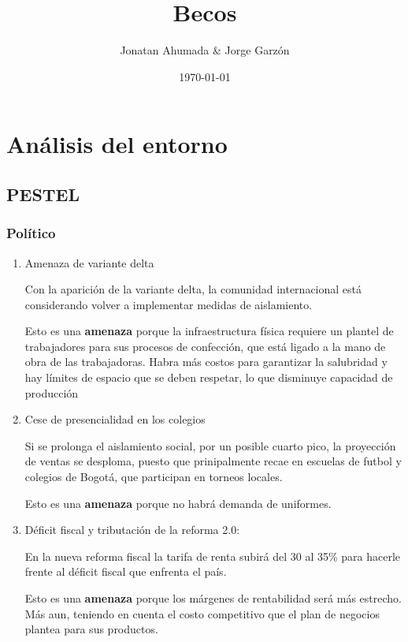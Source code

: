 \documentclass[11pt]{article}
\author{Jonatan Ahumada \& Jorge Garzón}
\date{\today}
\title{Becos}
\begin{document}
\maketitle
\tableofcontents



\section{Análisis del entorno}
\label{sec:orgb5b8dd2}
\subsection{PESTEL}
\label{sec:org09f5649}
\subsubsection{Político}
\label{sec:orga4b85a3}
\begin{enumerate}
\item Amenaza de variante delta
\label{sec:orgd4d9a0e}

Con la aparición de la variante delta, la comunidad internacional está
considerando volver a implementar medidas de aislamiento.

Esto es una \textbf{amenaza} porque la infraestructura física requiere un
plantel de trabajadores para sus procesos de confección, que está
ligado a la mano de obra de las trabajadoras. Habra más costos para
garantizar la salubridad y hay límites de espacio que se deben
respetar, lo que disminuye capacidad de producción

\item Cese de presencialidad en los colegios
\label{sec:org9913e54}

Si se prolonga el aislamiento social, por un posible cuarto pico, la
proyección de ventas se desploma, puesto que prinipalmente recae en
escuelas de futbol y colegios de Bogotá, que participan en torneos
locales.

Esto es una \textbf{amenaza} porque no habrá demanda de uniformes.

\item Déficit fiscal y tributación de la reforma 2.0:
\label{sec:org4bb4264}

En la nueva reforma fiscal la tarifa de renta subirá del 30 al 35\%
para hacerle frente al déficit fiscal que enfrenta el país.

Esto es una \textbf{amenaza} porque los márgenes de rentabilidad será más
estrecho.  Más aun, teniendo en cuenta el costo competitivo que el
plan de negocios plantea para sus productos.
\end{enumerate}
\end{document}
